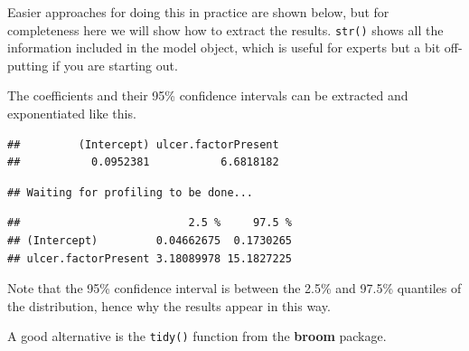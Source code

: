 \documentclass[
  12pt,
  krantz2]{krantz}
\makeatletter
\newenvironment{Shaded}{\begin{snugshade}}{\end{snugshade}}
\newcommand{\DataTypeTok}[1]{\textcolor[rgb]{0.13,0.29,0.53}{#1}}
\newcommand{\KeywordTok}[1]{\textcolor[rgb]{0.13,0.29,0.53}{\textbf{#1}}}
\newcommand{\NormalTok}[1]{#1}
\newcommand{\OperatorTok}[1]{\textcolor[rgb]{0.81,0.36,0.00}{\textbf{#1}}}
\newcommand{\OtherTok}[1]{\textcolor[rgb]{0.56,0.35,0.01}{#1}}
\newcommand{\StringTok}[1]{\textcolor[rgb]{0.31,0.60,0.02}{#1}}
\newenvironment{kframe}{%
\medskip{}
\setlength{\fboxsep}{.8em}
 \def\at@end@of@kframe{}%
 \ifinner\ifhmode%
  \def\at@end@of@kframe{\end{minipage}}%
  \begin{minipage}{\columnwidth}%
 \fi\fi%
 \def\FrameCommand##1{\hskip\@totalleftmargin \hskip-\fboxsep
 \colorbox{shadecolor}{##1}\hskip-\fboxsep
     \hskip-\linewidth \hskip-\@totalleftmargin \hskip\columnwidth}%
 \MakeFramed {\advance\hsize-\width
   \@totalleftmargin\z@ \linewidth\hsize
   \@setminipage}}%
 {\par\unskip\endMakeFramed%
 \at@end@of@kframe}
\renewenvironment{Shaded}{\begin{kframe}}{\end{kframe}}
\makeatother
\begin{document}
Easier approaches for doing this in practice are shown below, but for completeness here we will show how to extract the results.
\texttt{str()} shows all the information included in the model object, which is useful for experts but a bit off-putting if you are starting out.

The coefficients and their 95\% confidence intervals can be extracted and exponentiated like this.

\begin{Shaded}
\end{Shaded}

\begin{verbatim}
##         (Intercept) ulcer.factorPresent 
##           0.0952381           6.6818182
\end{verbatim}

\begin{Shaded}
\end{Shaded}

\begin{verbatim}
## Waiting for profiling to be done...
\end{verbatim}

\begin{verbatim}
##                          2.5 %     97.5 %
## (Intercept)         0.04662675  0.1730265
## ulcer.factorPresent 3.18089978 15.1827225
\end{verbatim}


Note that the 95\% confidence interval is between the 2.5\% and 97.5\% quantiles of the distribution, hence why the results appear in this way.

A good alternative is the \texttt{tidy()} function from the \textbf{broom} package.

\begin{Shaded}
\end{Shaded}
\end{document}
